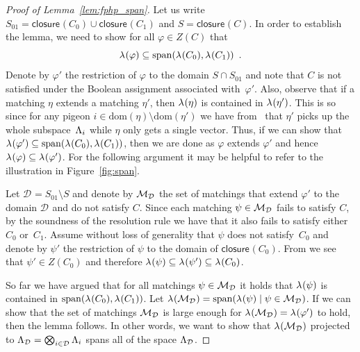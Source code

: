 \documentclass{theoretics}
\newcommand{\eqperiod}{\enspace .}
\newcommand{\reffig}[1]{Figure~\ref{#1}}
\newcommand{\reflem}[1]{Lemma~\ref{#1}}
\newcommand{\linspace}[1][]{\ensuremath \Lambda_{{#1}}}
\newcommand{\linmap}[1][]{\ensuremath \lambda_{{#1}}}
\newcommand{\linmapof}[2][]{\linmap[#1](#2)}
\newcommand{\closure}[2][]{\mathsf{closure}_{{#1}}(#2)}
\newcommand{\diffclosure}[1][]{D_{{#1}}}
\renewcommand{\diffclosure}[1][]{\mathcal{D}_{{#1}}}
\newcommand{\matcha}{\varphi}
\newcommand{\matchb}{\varphi'}
\newcommand{\matchc}{\psi}
\newcommand{\matchd}{\psi'}
\newcommand{\matche}{\eta}
\newcommand{\matchf}{\eta'}
\newcommand{\matchings}[1][]{\ensuremath \mathcal{M}_{{#1}}}
\newcommand{\spans}[1]{\mathrm{span} ( #1 )}
\newcommand{\dom}[1]{\mathrm{dom} ( #1 )}
\newcommand{\bigtensor}{\ensuremath \bigotimes}
\numberwithin{equation}{section}
\begin{document}
\begin{proof}[Proof of \reflem{lem:fphp_span}]
  Let us write 
  $S_{01} = \closure{C_0} \cup \closure{C_1}$ and $S = \closure{C}$.
  In order to establish
  the lemma,
  we need to show   for all $\matcha \in Z(C)$ that
  \begin{equation}
    \linmapof{\matcha} \subseteq 
    \spans{ \linmapof{C_0}, \linmapof{C_1} } 
    \eqperiod
  \end{equation}
  Denote by $\matchb$ the restriction of $\matcha$ to the domain 
  $S \cap S_{01}$
  and note
  that $C$ is not satisfied
  under the Boolean assignment associated with~$\matchb$.
  Also, observe that  if a matching $\matche$ extends a matching $\matchf$, then 
  $\linmapof{\matche}$ is contained in $\linmapof{\matchf}$. This is so since
  for any pigeon
  $i \in \dom{\matche} \setminus \dom{\matchf}$
  we have  from~
  that $\matchf$ picks up the whole subspace~$\linspace[i]$
  while $\matche$ only gets a single vector.  
  Thus, if we can show that
  $\linmapof{\matchb} \subseteq \spans{ \linmapof{C_0}, \linmapof{C_1}
  }$, then we are done as $\matcha$ extends $\matchb$ and hence
  $\linmapof{\matcha} \subseteq \linmapof{\matchb}$. For the following
  argument it may be helpful to refer to the illustration in
  \reffig{fig:span}.
  

  Let $\diffclosure = S_{01} \setminus S$ and denote by 
  $\matchings[\diffclosure]$ 
  the set of matchings
  that extend $\matchb$ to the domain $\diffclosure$ and do not satisfy $C$. 
  Since each matching $\matchc \in \matchings[\diffclosure]$ 
  fails to satisfy $C$,
  by the soundness of the resolution rule we have that it also fails
  to satisfy either     
  $C_0$ or~$C_1$. Assume without loss of generality that $\matchc$
  does not satisfy~$C_0$ and denote
  by $\matchd$ the restriction of $\matchc$ to the domain of
  $\closure{C_0}$. 
  From  we see that
  $\matchd \in Z(C_0)$ 
  and therefore
  $\linmapof{\matchc} \subseteq \linmapof{\matchd} \subseteq
  \linmapof{C_0}$.
  
  So far we have argued that for all matchings $\matchc \in \matchings[\diffclosure]$ 
  it holds that
  $\linmapof{\matchc}$ is contained in $\spans{\linmapof{C_0}, \linmapof{C_1}}$.
  Let $\linmapof{\matchings[\diffclosure]} = 
  \spans{\linmapof{\matchc} \mid \matchc \in \matchings[\diffclosure]}$.
  If we can show that the set of matchings
  $\matchings[\diffclosure]$ 
  is large enough for 
  $\linmapof{\matchings[\diffclosure]} = \linmapof{\matchb}$
  to hold, then the lemma follows.
  In other words, we want to show that
  $\linmapof{\matchings[\diffclosure]}$ 
  projected to 
  $\linspace[\diffclosure] = 
  \bigtensor_{i \in \diffclosure} \linspace[i]$
  spans all of the space $\linspace[\diffclosure]$.


\end{proof}
\end{document}
